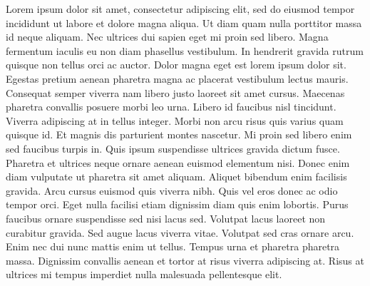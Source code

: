 
\begin{resumo} 

Lorem ipsum dolor sit amet, consectetur adipiscing elit, sed do eiusmod tempor incididunt ut labore et dolore magna aliqua. Ut diam quam nulla porttitor massa id neque aliquam. Nec ultrices dui sapien eget mi proin sed libero. Magna fermentum iaculis eu non diam phasellus vestibulum. In hendrerit gravida rutrum quisque non tellus orci ac auctor. Dolor magna eget est lorem ipsum dolor sit. Egestas pretium aenean pharetra magna ac placerat vestibulum lectus mauris. Consequat semper viverra nam libero justo laoreet sit amet cursus. Maecenas pharetra convallis posuere morbi leo urna. Libero id faucibus nisl tincidunt. Viverra adipiscing at in tellus integer. Morbi non arcu risus quis varius quam quisque id. Et magnis dis parturient montes nascetur. Mi proin sed libero enim sed faucibus turpis in. Quis ipsum suspendisse ultrices gravida dictum fusce.
Pharetra et ultrices neque ornare aenean euismod elementum nisi. Donec enim diam vulputate ut pharetra sit amet aliquam. Aliquet bibendum enim facilisis gravida. Arcu cursus euismod quis viverra nibh. Quis vel eros donec ac odio tempor orci. Eget nulla facilisi etiam dignissim diam quis enim lobortis. Purus faucibus ornare suspendisse sed nisi lacus sed. Volutpat lacus laoreet non curabitur gravida. Sed augue lacus viverra vitae. Volutpat sed cras ornare arcu. Enim nec dui nunc mattis enim ut tellus. Tempus urna et pharetra pharetra massa. Dignissim convallis aenean et tortor at risus viverra adipiscing at. Risus at ultrices mi tempus imperdiet nulla malesuada pellentesque elit.


\end{resumo}

